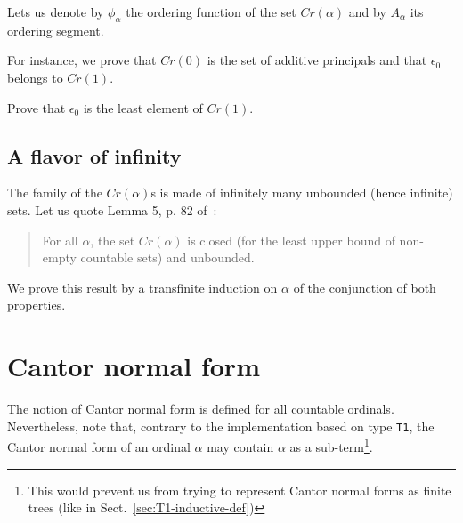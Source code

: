 {

Lets us denote by $\phi_\alpha$ the ordering function of the set $\textit{Cr}(\alpha)$ and by $A_\alpha$ its ordering segment.



\label{sect:phi-schutte}



For instance,  we prove that $\textit{Cr}(0)$ is the set of additive principals and that $\epsilon_0$
belongs to $\textit{Cr}(1)$.





\begin{exercise}
 Prove that $\epsilon_0$ is the least element of $\textit{Cr}(1)$.
\end{exercise}


\subsection{A flavor of infinity}



The family of the $\textit{Cr}(\alpha)$s is made of infinitely many unbounded (hence infinite) sets.
Let us quote Lemma 5, p. 82  of~\cite{schutte}:
\begin{quote}
  For all $\alpha$, the set $\textit{Cr}(\alpha)$ is closed (for the least upper bound of non-empty countable sets) and unbounded.
\end{quote}

We prove this result by a transfinite induction on $\alpha$ of the conjunction of  both properties.









\section{Cantor normal form}

The notion of Cantor normal form is defined for all countable ordinals.
Nevertheless, note that, contrary to the implementation based on type \texttt{T1},
the Cantor normal form of an ordinal $\alpha$ may contain $\alpha$ as a 
sub-term\footnote{This would prevent us from trying to represent Cantor normal forms as finite trees (like in Sect.~\ref{sec:T1-inductive-def})}.

}
